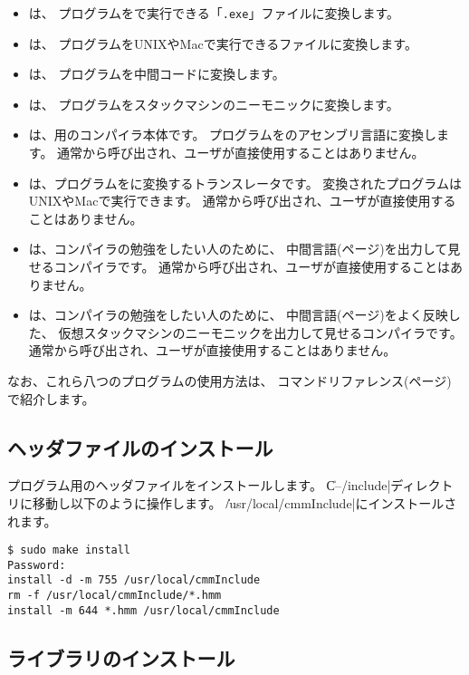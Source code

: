 \begin{itemize}
\item {\cme}は、
{\cmm}プログラムを{\tac}で実行できる「{\tt .exe}」ファイルに変換します。
\item {\cmc}は、
{\cmm}プログラムをUNIXやMacで実行できるファイルに変換します。
\item {\cmi}は、
{\cmm}プログラムを中間コードに変換します。
\item {\cmv}は、
{\cmm}プログラムをスタックマシンのニーモニックに変換します。
\item {\cmmc}は、{\tac}用の{\cmml}コンパイラ本体です。
{\cmm}プログラムを{\tac}のアセンブリ言語に変換します。
通常{\cme}から呼び出され、ユーザが直接使用することはありません。
\item {\ccmmc}は、{\cmm}プログラムを{\cl}に変換するトランスレータです。
変換された{\cl}プログラムはUNIXやMacで実行できます。
通常{\cmc}から呼び出され、ユーザが直接使用することはありません。
\item {\icmmc}は、コンパイラの勉強をしたい人のために、
中間言語(\pageref{app:vm}ページ)を出力して見せるコンパイラです。
通常{\cmi}から呼び出され、ユーザが直接使用することはありません。
\item {\vcmmc}は、コンパイラの勉強をしたい人のために、
中間言語(\pageref{app:vm}ページ)をよく反映した、
仮想スタックマシンのニーモニックを出力して見せるコンパイラです。
通常{\cmv}から呼び出され、ユーザが直接使用することはありません。
\end{itemize}

なお、これら八つのプログラムの使用方法は、
コマンドリファレンス(\pageref{app:command}ページ)で紹介します。

\subsection{ヘッダファイルのインストール}

{\cmml}プログラム用のヘッダファイルをインストールします。
\|C--/include|ディレクトリに移動し以下のように操作します。
\|/usr/local/cmmInclude|にインストールされます。

\begin{mylist}
\begin{verbatim}
$ sudo make install
Password:
install -d -m 755 /usr/local/cmmInclude
rm -f /usr/local/cmmInclude/*.hmm
install -m 644 *.hmm /usr/local/cmmInclude
\end{verbatim}
\end{mylist}

\subsection{ライブラリのインストール}

